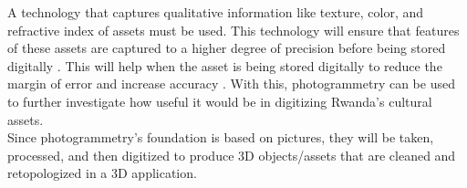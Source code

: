\documentclass[conference]{IEEEtran}
\begin{document}

A technology that captures qualitative information like texture, color, and refractive index of assets must be used. This technology will ensure that features of these assets are captured to a higher degree of precision before being stored digitally \cite{Linder2006}. This will help when the asset is being stored digitally to reduce the margin of error and increase accuracy \cite{accphtgm}. With this, photogrammetry can be used to further investigate how useful it would be in digitizing Rwanda’s cultural assets. \\


Since photogrammetry’s foundation is based on pictures, they will be taken, processed, and then digitized to produce 3D objects/assets that are cleaned and retopologized in a 3D application.

\end{document}

